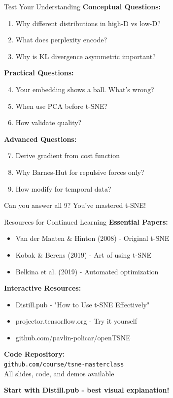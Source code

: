 \documentclass[aspectratio=169]{beamer}
\begin{document}
\begin{frame}{Test Your Understanding}
\textbf{Conceptual Questions:}
\begin{enumerate}
\item Why different distributions in high-D vs low-D?
\item What does perplexity encode?
\item Why is KL divergence asymmetric important?
\end{enumerate}

\textbf{Practical Questions:}
\begin{enumerate}
\setcounter{enumi}{3}
\item Your embedding shows a ball. What's wrong?
\item When use PCA before t-SNE?
\item How validate quality?
\end{enumerate}

\textbf{Advanced Questions:}
\begin{enumerate}
\setcounter{enumi}{6}
\item Derive gradient from cost function
\item Why Barnes-Hut for repulsive forces only?
\item How modify for temporal data?
\end{enumerate}

\colorbox{green!30}{Can you answer all 9? You've mastered t-SNE!}
\end{frame}

\begin{frame}{Resources for Continued Learning}
\textbf{Essential Papers:}
\begin{itemize}
\item Van der Maaten \& Hinton (2008) - Original t-SNE
\item Kobak \& Berens (2019) - Art of using t-SNE
\item Belkina et al. (2019) - Automated optimization
\end{itemize}

\textbf{Interactive Resources:}
\begin{itemize}
\item Distill.pub - "How to Use t-SNE Effectively"
\item projector.tensorflow.org - Try it yourself
\item github.com/pavlin-policar/openTSNE
\end{itemize}

\textbf{Code Repository:}\\
\texttt{github.com/course/tsne-masterclass}\\
All slides, code, and demos available

\begin{center}
\colorbox{blue!30}{\textbf{Start with Distill.pub - best visual explanation!}}
\end{center}
\end{frame}
\end{document}
